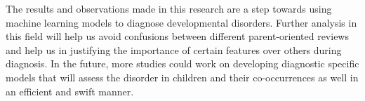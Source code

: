 The results and observations made in this research are a step towards using machine learning models to diagnose developmental disorders. Further analysis in this field will help us avoid confusions between different parent-oriented reviews and help us in justifying the importance of certain features over others during diagnosis. In the future, more studies could work on developing diagnostic specific models that will assess the disorder in children and their co-occurrences as well in an efficient and swift manner.
